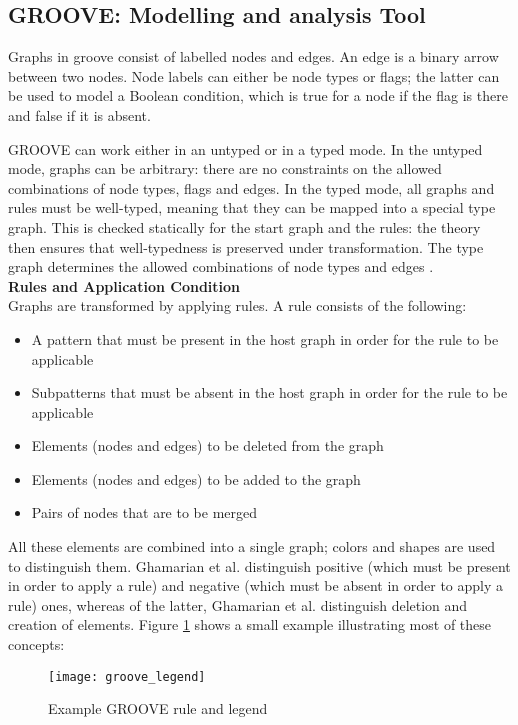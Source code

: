 \subsection{GROOVE: Modelling and analysis Tool}\label{groove}
Graphs in groove consist of labelled nodes and edges. An edge is a binary arrow between two nodes. Node labels can either be node types or ﬂags; the latter can be used to model a Boolean condition, which is true for a node if the ﬂag is there and false if it is absent.

GROOVE can work either in an untyped or in a typed mode. In the untyped mode, graphs can be arbitrary: there are no constraints on the allowed combinations of node types, ﬂags and edges. In the typed mode, all graphs and rules must be well-typed, meaning that they can be mapped into a special type graph. This is checked statically for the start graph and the rules: the theory then ensures that well-typedness is preserved under transformation. The type graph determines the allowed combinations of node types and edges \cite{ghamarian2012modelling}.\\ 
\textbf{Rules and Application Condition}\\ 
Graphs are transformed by applying rules. A rule consists of the following:
\begin{itemize}
\item A pattern that must be present in the host graph in order for the rule to be applicable
\item Subpatterns that must be absent in the host graph in order for the rule to be applicable
\item Elements (nodes and edges) to be deleted from the graph
\item Elements (nodes and edges) to be added to the graph
\item Pairs of nodes that are to be merged
\end{itemize}
All these elements are combined into a single graph; colors and shapes are used to distinguish them. Ghamarian et al. distinguish positive (which must be present in order to apply a rule) and negative (which must be absent in order to apply a rule) ones, whereas of the latter, Ghamarian et al. distinguish deletion and creation of elements. Figure \ref{fig:groove_legend} shows a small example illustrating most of these concepts:
\begin{figure}
\center
\texttt{[image: groove\_legend]}
\caption{Example GROOVE rule and legend  \cite{ghamarian2012modelling} }\label{fig:groove_legend}
\end{figure}
